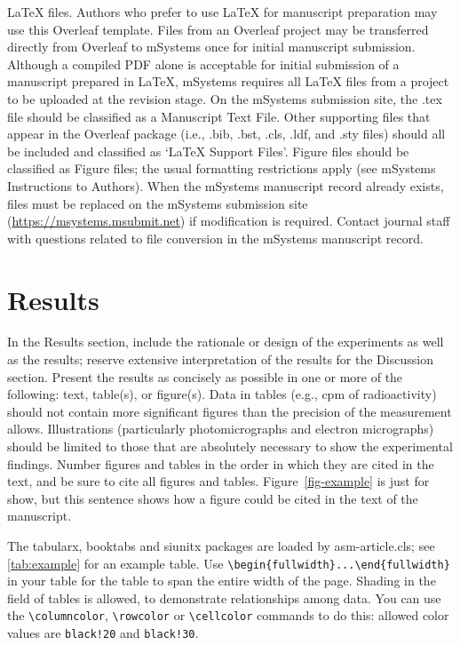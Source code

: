 \documentclass[
  lineno]{asm}
\begin{document}
\LaTeX{} files. Authors who prefer to use \LaTeX{} for manuscript
preparation may use this Overleaf template. Files from an Overleaf
project may be transferred directly from Overleaf to mSystems once for
initial manuscript submission. Although a compiled PDF alone is
acceptable for initial submission of a manuscript prepared in \LaTeX{},
mSystems requires all \LaTeX{} files from a project to be uploaded at
the revision stage. On the mSystems submission site, the .tex file
should be classified as a Manuscript Text File. Other supporting files
that appear in the Overleaf package (i.e., .bib, .bst, .cls, .ldf, and
.sty files) should all be included and classified as `LaTeX Support
Files'. Figure files should be classified as Figure files; the usual
formatting restrictions apply (see mSystems Instructions to Authors).
When the mSystems manuscript record already exists, files must be
replaced on the mSystems submission site
(\url{https://msystems.msubmit.net}) if modification is required.
Contact journal staff with questions related to file conversion in the
mSystems manuscript record.

\section{Results}\label{results}

In the Results section, include the rationale or design of the
experiments as well as the results; reserve extensive interpretation of
the results for the Discussion section. Present the results as concisely
as possible in one or more of the following: text, table(s), or
figure(s). Data in tables (e.g., cpm of radioactivity) should not
contain more significant figures than the precision of the measurement
allows. Illustrations (particularly photomicrographs and electron
micrographs) should be limited to those that are absolutely necessary to
show the experimental findings. Number figures and tables in the order
in which they are cited in the text, and be sure to cite all figures and
tables. Figure~\ref{fig-example} is just for show, but this sentence
shows how a figure could be cited in the text of the manuscript.

The tabularx, booktabs and siunitx packages are loaded by
asm-article.cls; see \autoref{tab:example} for an example table. Use
\verb|\begin{fullwidth}...\end{fullwidth}| in your table for the table
to span the entire width of the page. Shading in the field of tables is
allowed, to demonstrate relationships among data. You can use the
\verb|\columncolor|, \verb|\rowcolor| or \verb|\cellcolor| commands to
do this: allowed color values are \verb|black!20| and \verb|black!30|.
\end{document}
